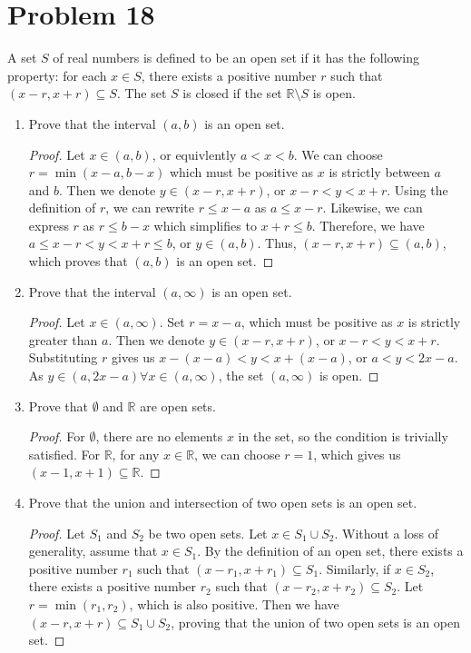 \documentclass[12pt]{article}
\begin{document}
  \section*{Problem 18}
  A set $S$ of real numbers is defined to be an open set if it has the following property: for each $x \in S$, there exists a positive number $r$ such that $(x - r, x + r) \subseteq S$. The set $S$ is closed if the set $\mathbb{R} \setminus S$ is open.
  \begin{enumerate}[label=(\alph*)]
    
    \item Prove that the interval $(a, b)$ is an open set.
    \begin{proof}
      Let $x \in (a, b)$, or equivlently $a < x < b$. We can choose $r = \min(x - a, b - x)$ which must be positive as $x$ is strictly between $a$ and $b$. Then we denote $y \in (x - r, x + r)$, or $x - r < y < x + r$. Using the definition of $r$, we can rewrite $r \leq x - a$ as $a \leq x - r.$ Likewise, we can express $r$ as $r \leq b - x$ which simplifies to $x + r \leq b$. Therefore, we have $a \leq x - r < y < x + r \leq b$, or $y \in (a, b)$. Thus, $(x - r, x + r) \subseteq (a, b)$, which proves that $(a, b)$ is an open set.
    \end{proof}

    \item Prove that the interval $(a, \infty)$ is an open set.
    \begin{proof}
      Let $x \in (a, \infty)$. Set $r = x - a$, which must be positive as $x$ is strictly greater than $a$. Then we denote $y \in (x - r, x + r)$, or $x - r < y < x + r$. Substituting $r$ gives us $x - (x - a) < y < x + (x - a)$, or $a < y < 2x - a$. As $y \in (a, 2x - a) \forall x \in (a, \infty)$, the set $(a, \infty)$ is open. 
    \end{proof}
    
    \item Prove that $\emptyset$ and $\mathbb{R}$ are open sets.
    \begin{proof}
      For $\emptyset$, there are no elements $x$ in the set, so the condition is trivially satisfied. For $\mathbb{R}$, for any $x \in \mathbb{R}$, we can choose $r = 1$, which gives us $(x - 1, x + 1)\subseteq \mathbb{R}$.
    \end{proof}

    \item Prove that the union and intersection of two open sets is an open set.
    \begin{proof}
      Let $S_1$ and $S_2$ be two open sets. Let $x \in S_1 \cup S_2$. Without a loss of generality, assume that $x \in S_1$. By the definition of an open set, there exists a positive number $r_1$ such that $(x - r_1, x + r_1) \subseteq S_1$. Similarly, if $x \in S_2$, there exists a positive number $r_2$ such that $(x - r_2, x + r_2) \subseteq S_2$. Let $r = \min(r_1, r_2)$, which is also positive. Then we have $(x - r, x + r) \subseteq S_1 \cup S_2$, proving that the union of two open sets is an open set.
      

\end{proof}
\end{enumerate}
\end{document}
